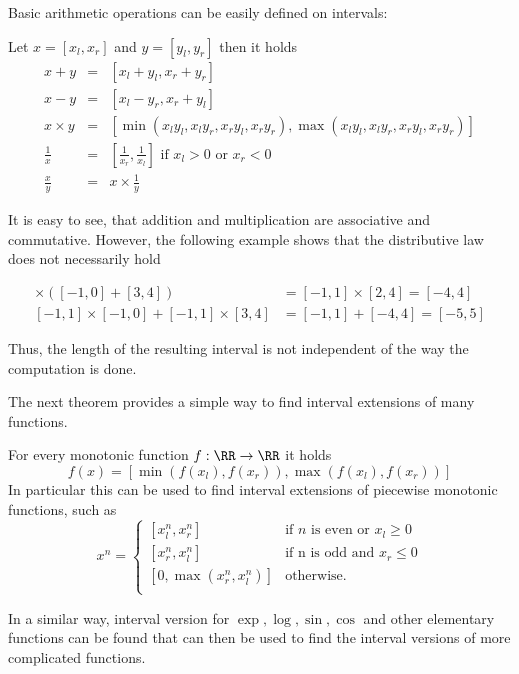   Basic arithmetic operations can be easily defined on intervals:
	\begin{theorem}
		Let $x = [x_l, x_r]$ and $y = [y_l, y_r]$ then it holds
		\begin{eqnarray}
			x + y  & = & [x_l + y_l, x_r + y_r] \\
			x - y  & = & [x_l - y_r, x_r + y_l] \\
			x \times y  & = & [\min(x_ly_l, x_ly_r, x_ry_l, x_ry_r), \max(x_ly_l, x_ly_r, x_ry_l, x_ry_r)] \\
			\frac{1}{x} & = & \left[\frac{1}{x_r}, \frac{1}{x_l} \right] \text{ if } x_l > 0 \text{ or } x_r < 0 \\
			\frac{x}{y} & = & x \times \frac{1}{y}   
		\end{eqnarray}
	\end{theorem}
	It is easy to see, that addition and multiplication are associative and commutative.
	However, the following example shows that the distributive law does not necessarily hold
	\begin{example}
		\begin{align*}
			[-1,1] \times ([-1,0] + [3,4])  &= [-1,1] \times [2,4] = [-4,4] \\
			[-1,1] \times [-1,0] + [-1,1] \times [3,4] &=  [-1,1] + [-4,4] =[-5,5] 
		\end{align*}
	\end{example} 
	Thus, the length of the resulting interval is not independent of the way the
  computation is done.
	
	The next theorem provides a simple way to find interval extensions of many functions.
	\begin{theorem}
		For every monotonic function $f: \RR \to \RR$ it holds
		$$ f(x) = [\min(f(x_l), f(x_r)), \max(f(x_l), f(x_r))] $$
		In particular this can be used to find interval extensions of piecewise monotonic functions, such as
		\begin{equation}
			x^n  =   
				\begin{cases} 
					[x_l^n, x_r^n] &\mbox{if } n \mbox{ is even or } x_l \geq 0 \\
					[x_r^n, x_l^n] &\mbox{if n is odd and } x_r \leq 0 \\
					[0, \max(x_r^n, x_l^n)] & \mbox{otherwise.}  \\
				\end{cases} 
		\end{equation} 
	\end{theorem}
	In a similar way, interval version for $\exp, \log, \sin, \cos$ and other
  elementary functions can be found
	that can then be used to find the interval versions of more complicated functions.


